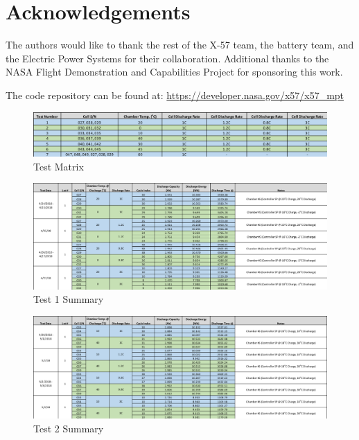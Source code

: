 \documentclass[]{aiaa-tc}%
\begin{document}
\section{Acknowledgements}

The authors would like to thank the rest of the X-57 team, the battery team, and the Electric Power Systems for their collaboration. Additional thanks to the NASA Flight Demonstration and Capabilities Project for sponsoring this work.





\pagebreak
The code repository can be found at:
\url{https://developer.nasa.gov/x57/x57_mpt}


\begin{figure}[!htb]
	\centering
	\includegraphics[width=1.0\textwidth]{figures/Test_Matrix.png}
	\caption{Test Matrix}
	\label{fig:TestMatrix}
\end{figure}

\begin{figure}[!htb]
	\centering
	\includegraphics[width=1.0\textwidth]{figures/Test1Summary.png}
	\caption{Test 1 Summary}
	\label{fig:Test1Summary}
\end{figure}

\begin{figure}[!htb]
	\centering
	\includegraphics[width=1.0\textwidth]{figures/Test2Summary.png}
	\caption{Test 2 Summary}
	\label{fig:Test2Summary}
\end{figure}
\end{document}
